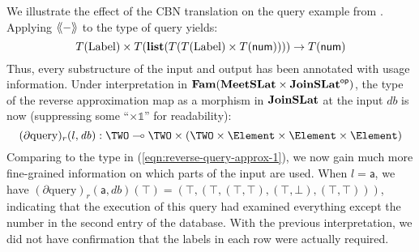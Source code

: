 We illustrate the effect of the CBN translation on the query example from
. Applying $\langle\kern-2pt\langle - \rangle\kern-2pt\rangle$ to the type of $\mathrm{query}$ yields:
\begin{displaymath}
  T(\mathrm{Label}) \times T(\mathbf{list}(T(T(\mathrm{Label}) \times T(\mathsf{num})))) \to T(\mathsf{num})
\end{displaymath}
Thus, every substructure of the input and output has been annotated with usage information. Under
interpretation in $\mathbf{Fam}(\mathbf{MeetSLat} \times \mathbf{JoinSLat}^{\mathsf{op}})$, the type of the reverse approximation map as a
morphism in $\mathbf{JoinSLat}$ at the input $\mathit{db}$ is now (suppressing some ``$\times \mathbb{1}$'' for
readability):
\begin{displaymath}
  (\partial \mathrm{query})_r(l, \mathit{db}) : \TWO \multimap \TWO \times (\TWO \times \Element \times \Element \times \Element)
\end{displaymath}
Comparing to the type in (\ref{eqn:reverse-query-approx-1}), we now gain much more fine-grained information on
which parts of the input are used. When $l = \mathsf{a}$, we have
$(\partial \mathrm{query})_r(\mathsf{a},\mathit{db})(\top) = (\top, (\top, (\top, \top), (\top, \bot), (\top,
\top)))$, indicating that the execution of this query had examined everything except the number in the second
entry of the database. With the previous interpretation, we did not have confirmation that the labels in each
row were actually required.

